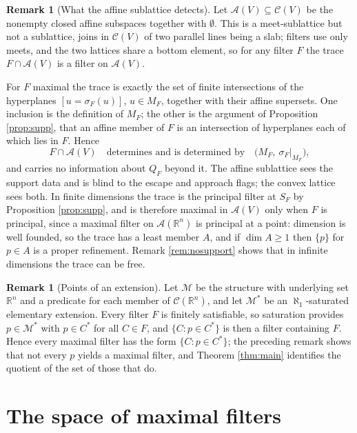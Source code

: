 \documentclass[11pt]{amsart}
\theoremstyle{plain}
\theoremstyle{definition}
\newtheorem{remark}[theorem]{Remark}
\newcommand{\CC}{\mathscr{C}}
\newcommand{\RR}{\mathbb{R}}
\begin{document}
\begin{remark}[What the affine sublattice detects]\label{rem:affine}
Let $\mathcal{A}(V)\subseteq\CC(V)$ be the nonempty closed affine subspaces together with $\emptyset$. This is a meet-sublattice but not a sublattice, joins in $\CC(V)$ of two parallel lines being a slab; filters use only meets, and the two lattices share a bottom element, so for any filter $F$ the trace $F\cap\mathcal{A}(V)$ is a filter on $\mathcal{A}(V)$.

For $F$ maximal the trace is exactly the set of finite intersections of the hyperplanes $[u=\sigma_F(u)]$, $u\in M_F$, together with their affine supersets. One inclusion is the definition of $M_F$; the other is the argument of Proposition \ref{prop:supp}, that an affine member of $F$ is an intersection of hyperplanes each of which lies in $F$. Hence
\[
F\cap\mathcal{A}(V)\quad\text{determines and is determined by}\quad\big(M_F,\ \sigma_F|_{M_F}\big),
\]
and carries no information about $Q_F$ beyond it. The affine sublattice sees the support data and is blind to the escape and approach flags; the convex lattice sees both. In finite dimensions the trace is the principal filter at $S_F$ by Proposition \ref{prop:supp}, and is therefore maximal in $\mathcal{A}(V)$ only when $F$ is principal, since a maximal filter on $\mathcal{A}(\RR^n)$ is principal at a point: dimension is well founded, so the trace has a least member $A$, and if $\dim A\ge1$ then $\{p\}$ for $p\in A$ is a proper refinement. Remark \ref{rem:nosupport} shows that in infinite dimensions the trace can be free.
\end{remark}

\begin{remark}[Points of an extension]\label{rem:extension}
Let $\mathcal{M}$ be the structure with underlying set $\RR^n$ and a predicate for each member of $\CC(\RR^n)$, and let $\mathcal{M}^{*}$ be an $\aleph_1$-saturated elementary extension. Every filter $F$ is finitely satisfiable, so saturation provides $p\in\mathcal{M}^{*}$ with $p\in C^{*}$ for all $C\in F$, and $\{C:p\in C^{*}\}$ is then a filter containing $F$. Hence every maximal filter has the form $\{C:p\in C^{*}\}$; the preceding remark shows that not every $p$ yields a maximal filter, and Theorem \ref{thm:main} identifies the quotient of the set of those that do.
\end{remark}

\section{The space of maximal filters}\label{sec:space}
\end{document}
